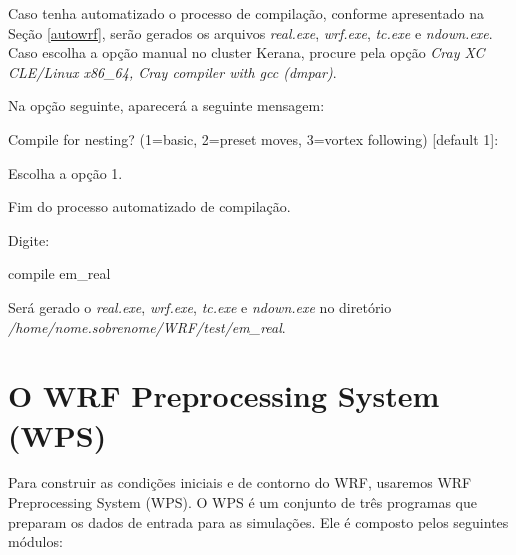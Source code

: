 \noindent Caso tenha automatizado o processo de compilação, conforme apresentado na Seção \textcolor{bleu_cite}{\ref{autowrf}}, serão gerados os arquivos \textit{real.exe}, \textit{wrf.exe}, \textit{tc.exe} e \textit{ndown.exe}. Caso escolha a opção manual no cluster Kerana, procure pela opção \textit{Cray XC CLE/Linux x86\_64, Cray compiler with gcc  (dmpar)}.
\bigskip

\noindent Na opção seguinte, aparecerá a seguinte mensagem:
\bigskip

\begin{bashcode}
Compile for nesting? (1=basic, 2=preset moves, 3=vortex following) [default 1]:
\end{bashcode}
\bigskip

\noindent Escolha a opção 1.
\bigskip

\begin{tcolorbox}[enhanced,
  grow to left by=0cm,%
  grow to right by=0cm,%
  enlarge top by=0cm,%
  enlarge bottom by=0cm,%
  tcbox raise base,
  boxrule=1.0pt,
  left=18mm,
  colframe=red!50!black,coltext=red!25!black,colback=red!10!white,
  overlay={\begin{tcbclipinterior}\fill[red!75!blue!50!white] (frame.south west)
    rectangle node[text=white,font=\sffamily\bfseries\footnotesize,rotate=0] {ATENÇÃO} ([xshift=18mm]frame.north west);\end{tcbclipinterior}}]
Fim do processo automatizado de compilação.
\end{tcolorbox}
\bigskip

\noindent Digite:
\bigskip

\begin{bashcode}
compile em_real
\end{bashcode}
\bigskip

\noindent Será gerado o \textit{real.exe}, \textit{wrf.exe}, \textit{tc.exe} e \textit{ndown.exe} no diretório \textit{/home/nome.sobrenome/WRF/test/em\_real}.
\bigskip

\section{O WRF Preprocessing System (WPS)}
\bigskip

\noindent Para construir as condições iniciais e de contorno do WRF, usaremos WRF Preprocessing System (WPS). O WPS é um conjunto de três programas que preparam os dados de entrada para as simulações. Ele é composto pelos seguintes módulos:
\bigskip

